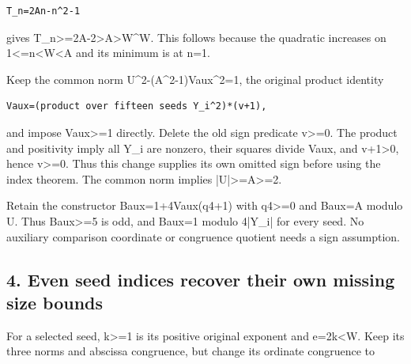 \begin{verbatim}
T_n=2An-n^2-1
\end{verbatim}

gives T\_\allowbreak{}n\textgreater{}\allowbreak{}=\allowbreak{}2A-2\textgreater{}\allowbreak{}A\textgreater{}\allowbreak{}W\textasciicircum{}\allowbreak{}W. This follows because the quadratic increases on 1\textless{}\allowbreak{}=\allowbreak{}n\textless{}\allowbreak{}W\textless{}\allowbreak{}A and its minimum is at n=\allowbreak{}1.



Keep the common norm U\textasciicircum{}\allowbreak{}2-(A\textasciicircum{}\allowbreak{}2-1)Vaux\textasciicircum{}\allowbreak{}2=\allowbreak{}1, the original product identity



\begin{verbatim}
Vaux=(product over fifteen seeds Y_i^2)*(v+1),
\end{verbatim}

and impose Vaux\textgreater{}\allowbreak{}=\allowbreak{}1 directly. Delete the old sign predicate v\textgreater{}\allowbreak{}=\allowbreak{}0. The product and positivity imply all Y\_\allowbreak{}i are nonzero, their squares divide Vaux, and v+\allowbreak{}1\textgreater{}\allowbreak{}0, hence v\textgreater{}\allowbreak{}=\allowbreak{}0. Thus this change supplies its own omitted sign before using the index theorem. The common norm implies |U|\textgreater{}\allowbreak{}=\allowbreak{}A\textgreater{}\allowbreak{}=\allowbreak{}2.



Retain the constructor Baux=\allowbreak{}1+\allowbreak{}4Vaux\textasteriskcentered{}\allowbreak{}(q4+\allowbreak{}1) with q4\textgreater{}\allowbreak{}=\allowbreak{}0 and Baux=\allowbreak{}A modulo U. Thus Baux\textgreater{}\allowbreak{}=\allowbreak{}5 is odd, and Baux=\allowbreak{}1 modulo 4|Y\_\allowbreak{}i| for every seed. No auxiliary comparison coordinate or congruence quotient needs a sign assumption.



\subsection*{4. Even seed indices recover their own missing size bounds}



For a selected seed, k\textgreater{}\allowbreak{}=\allowbreak{}1 is its positive original exponent and e=\allowbreak{}2k\textless{}\allowbreak{}W. Keep its three norms and abscissa congruence, but change its ordinate congruence to



